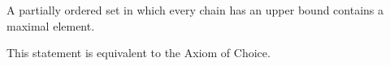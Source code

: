 A partially ordered set in which every chain has an upper bound contains a maximal element.

This statement is equivalent to the Axiom of Choice.
